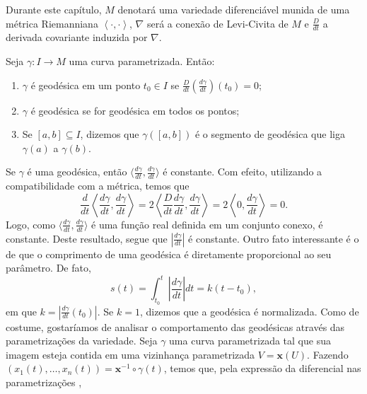 Durante este capítulo, $M$ denotará uma variedade diferenciável munida de uma métrica Riemanniana $\left< \cdot, \cdot\right>$, $\nabla$ será a conexão de Levi-Civita de $M$ e $\frac{D}{dt}$ a derivada covariante induzida por $\nabla$.
\begin{definition}
    \label{def:geodesica}
    Seja $\gamma:I\to M$ uma curva parametrizada. Então:

    \begin{enumerate}[label=(\roman*)]
        \item $\gamma$ é geodésica em um ponto $t_{0}\in I$ se $\frac{D}{dt}\left( \frac{d\gamma}{dt} \right)(t_{0})=0$;
        \item $\gamma$ é geodésica se for geodésica em todos os pontos;
        \item Se $[a,b]\subseteq I$, dizemos que $\gamma([a,b])$ é o segmento de geodésica que liga $\gamma(a)$ a $\gamma(b)$.
    \end{enumerate}
\end{definition}
Se $\gamma$ é uma geodésica, então $\langle \frac{d\gamma}{dt},\frac{d\gamma}{dt} \rangle$ é constante. Com efeito, utilizando a compatibilidade com a métrica, temos que
\begin{equation*}
    \frac{d}{dt}\left\langle \frac{d\gamma}{dt},\frac{d\gamma}{dt} \right\rangle=2\left\langle \frac{D}{dt}\frac{d\gamma}{dt},\frac{d\gamma}{dt} \right\rangle=2\left\langle 0,\frac{d\gamma}{dt} \right\rangle=0.
\end{equation*}
Logo, como $\langle \frac{d\gamma}{dt},\frac{d\gamma}{dt} \rangle$ é uma função real definida em um conjunto conexo, é constante.
Deste resultado, segue que $\left|\frac{d\gamma}{dt}\right|$ é constante.
Outro fato interessante é o de que o comprimento de uma geodésica é diretamente proporcional ao seu parâmetro. De fato,
\begin{equation*}
    s(t)=\int_{t_{0}}^{t}\left|\frac{d\gamma}{dt}\right|dt=k(t-t_{0}),
\end{equation*}
em que $k=\left|\frac{d\gamma}{dt}(t_{0})\right|$.
Se $k=1$, dizemos que a geodésica é normalizada.
Como de costume, gostaríamos de analisar o comportamento das geodésicas através das parametrizações da variedade.
Seja $\gamma$ uma  curva parametrizada tal que sua imagem esteja contida em uma vizinhança parametrizada $V=\mathbf{x}(U)$.
Fazendo $(x_{1}(t), \dots, x_{n}(t))=\mathbf{x}^{-1} \circ \gamma(t)$, temos que, pela expressão da diferencial nas parametrizações \parencite[p.~9, prop.~2.7]{doCarmo1992},

